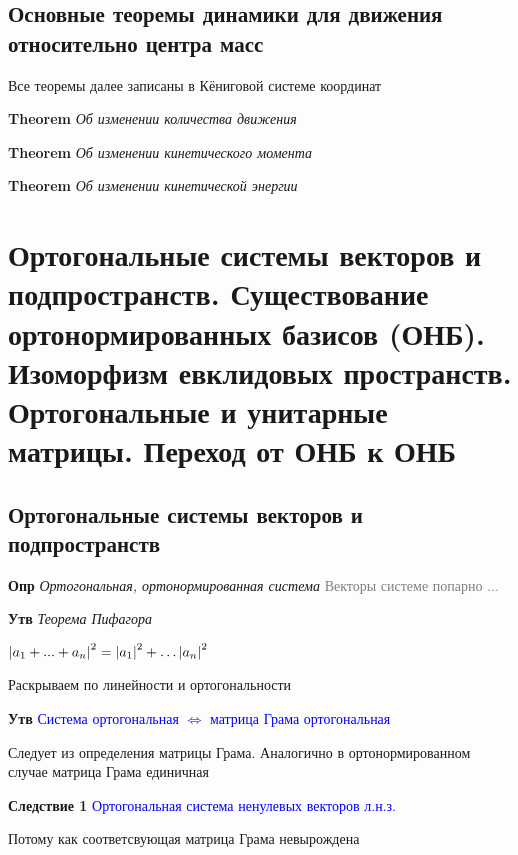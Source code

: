 \documentclass[a4paper, 14pt]{article}
\begin{document}
    \subsection{Основные теоремы динамики для движения относительно центра масс}
    
    Все теоремы далее записаны в Кёниговой системе координат
    
    \textbf{Theorem} \textit{Об изменении количества движения}
    
    \textbf{Theorem} \textit{Об изменении кинетического момента}
    
    \textbf{Theorem} \textit{Об изменении кинетической энергии}
    
    \section{Ортогональные системы векторов и подпространств.
    Существование ортонормированных базисов (ОНБ).
    Изоморфизм евклидовых пространств.
    Ортогональные и унитарные матрицы.
    Переход от ОНБ к ОНБ}
    
    \subsection{}
    
    \subsection{Ортогональные системы векторов и подпространств}
    
    \textbf{Опр} \textit{Ортогональная, ортонормированная система} \textcolor{gray}{Векторы системе попарно ...}
    
    \textbf{Утв} \textit{Теорема Пифагора}
    
    \textcolor{blue}{$\abs{a_1 + ... + a_n}^2 = \abs{a_1}^2 + \dots \abs{a_n}^2$}
    
    Раскрываем по линейности и ортогональности
    
    \textbf{Утв} \textcolor{blue}{Система ортогональная $\Leftrightarrow$ матрица Грама ортогональная}
    
    Следует из определения матрицы Грама.
    Аналогично в ортонормированном случае матрица Грама единичная
    
    \textbf{Следствие 1} \textcolor{blue}{Ортогональная система ненулевых векторов л.н.з.}
    
    Потому как соответсвующая матрица Грама невырождена
    
\end{document}
